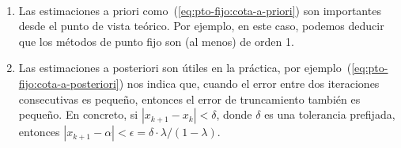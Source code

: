 
\begin{remark}~
  \begin{enumerate}
  \item Las estimaciones a priori
    como~(\ref{eq:pto-fijo:cota-a-priori}) son importantes desde el
    punto de vista teórico.  Por ejemplo, en este caso, podemos
    deducir que los métodos de punto fijo son (al menos) de orden 1.
  \item Las estimaciones a posteriori son útiles en la práctica, por
    ejemplo~(\ref{eq:pto-fijo:cota-a-posteriori}) nos indica que,
    cuando el error entre dos iteraciones consecutivas es pequeño,
    entonces el error de truncamiento también es pequeño.  En
    concreto, si $|x_{k+1}-x_k|<\delta$, donde $\delta$ es una
    tolerancia prefijada, entonces
    $|x_{k+1}-\alpha|<\epsilon=\delta\cdot\lambda/(1-\lambda)$.
  \end{enumerate}
\end{remark}

